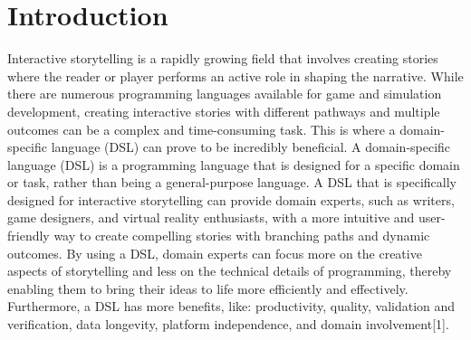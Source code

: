 \chapter*{Introduction}

Interactive storytelling is a rapidly growing field that involves creating stories where the reader or player performs an active role in shaping the narrative. While there are numerous programming languages available for game and simulation development, creating interactive stories with different pathways and multiple outcomes can be a complex and time-consuming task. This is where a domain-specific language (DSL) can prove to be incredibly beneficial. A domain-specific language (DSL) is a programming language that is designed for a specific domain or task, rather than being a general-purpose language. A DSL that is specifically designed for interactive storytelling can provide domain experts, such as writers, game designers, and virtual reality enthusiasts, with a more intuitive and user-friendly way to create compelling stories with branching paths and dynamic outcomes. By using a DSL, domain experts can focus more on the creative aspects of storytelling and less on the technical details of programming, thereby enabling them to bring their ideas to life more efficiently and effectively. Furthermore, a DSL has more benefits, like: productivity, quality, validation and verification, data longevity, platform independence, and domain involvement[1].